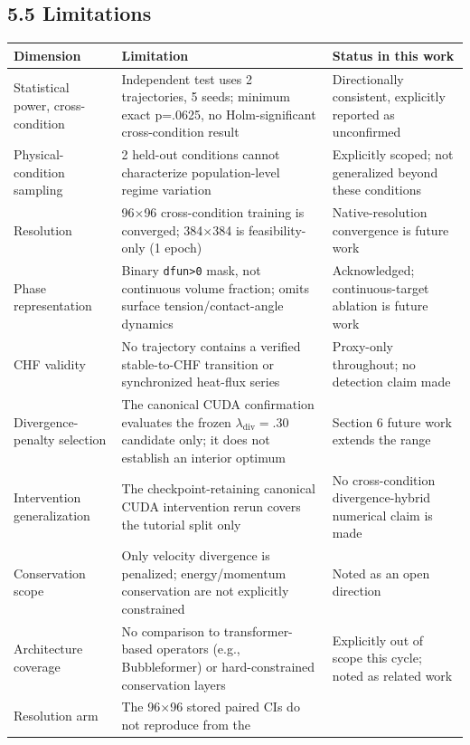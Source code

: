 \documentclass[preprint,12pt]{elsarticle}
\begin{document}
\subsection*{5.5 Limitations}\label{55-limitations}

{
\begin{longtable}[]{@{}P{0.25\textwidth}P{0.33\textwidth}P{0.29\textwidth}@{}}
\toprule\noalign{}
Dimension & Limitation & Status in this work \\
\midrule\noalign{}
\endhead
\bottomrule\noalign{}
\endlastfoot
Statistical power, cross-condition & Independent test uses 2
trajectories, 5 seeds; minimum exact p=.0625, no Holm-significant
cross-condition result & Directionally consistent, explicitly reported
as unconfirmed \\
Physical-condition sampling & 2 held-out conditions cannot characterize
population-level regime variation & Explicitly scoped; not generalized
beyond these conditions \\
Resolution & 96\ensuremath{\times}96 cross-condition training is converged; 384\ensuremath{\times}384 is
feasibility-only (1 epoch) & Native-resolution convergence is future
work \\
Phase representation & Binary \texttt{dfun\textgreater{}0} mask, not
continuous volume fraction; omits surface tension/contact-angle dynamics
& Acknowledged; continuous-target ablation is future work \\
CHF validity & No trajectory contains a verified stable-to-CHF
transition or synchronized heat-flux series & Proxy-only throughout; no
detection claim made \\
Divergence-penalty selection & The canonical CUDA confirmation evaluates
the frozen \(\lambda_{\text{div}}=.30\) candidate only; it does not
establish an interior optimum & Section 6 future work extends the
range \\
Intervention generalization & The checkpoint-retaining canonical CUDA
intervention rerun covers the tutorial split only & No cross-condition
divergence-hybrid numerical claim is made \\
Conservation scope & Only velocity divergence is penalized;
energy/momentum conservation are not explicitly constrained & Noted as
an open direction \\
Architecture coverage & No comparison to transformer-based operators
(e.g., Bubbleformer) or hard-constrained conservation layers &
Explicitly out of scope this cycle; noted as related work \\
Resolution arm & The 96\ensuremath{\times}96 stored paired CIs do not reproduce from the

\end{longtable}}
\end{document}
